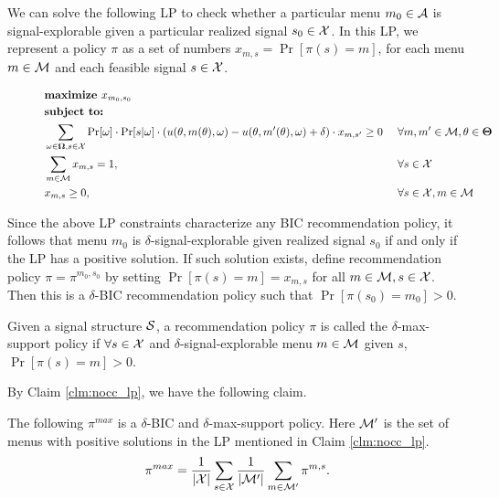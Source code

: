 We can solve the following LP to check whether a particular menu $m_0 \in\A$ is signal-explorable given a particular realized signal $s_0\in\X$. In this LP, we represent a policy $\pi$ as a set of numbers
    $x_{m,s} = \Pr[\pi(s)=m]$,
for each menu $m\in \M$ and each feasible signal $s\in \X$. 

\begin{figure}[H]
\begin{mdframed}
\begin{alignat*}{2}
 & \textbf{maximize }    x_{m_0,s_0}\  \\
&  \textbf{subject to: }\\
 & \sum_{\omega \in \varOmega, s \in \X} \Pr[\omega] \cdot \Pr[s | \omega] \cdot \left(u(\theta, m(\theta), \omega) - u(\theta, m'(\theta), \omega) + \delta\right) \cdot x_{m,s'} \geq 0  &\ & \forall m,m' \in \M, \theta \in \varTheta \\
                       & \sum_{m\in \M} x_{m,s} = 1,  \ &\ & \forall s \in \X \\
                       & x_{m,s} \geq 0,  \ &\ & \forall s \in \X, m\in \M \\
\end{alignat*}
\end{mdframed}
\label{fig:nocc_lp}
\end{figure}

Since the above LP constraints characterize any BIC recommendation policy, it follows that
menu $m_0$ is $\delta$-signal-explorable given realized signal $s_0$ if and only if the LP has a positive solution. If such solution exists, define recommendation policy $\pi = \pi^{m_0,s_0}$ by setting $\Pr[\pi(s) = m] = x_{m,s}$ for all $m \in \M, s \in \X$. Then this is a $\delta$-BIC recommendation policy such that $\Pr[\pi(s_0) = m_0] > 0$.

\begin{definition}
Given a signal structure $\S$, a recommendation policy $\pi$ is called the $\delta$-max-support policy if $\forall s \in \X$  and $\delta$-signal-explorable menu $m\in \M$ given $s$, $\Pr[\pi(s) = m] > 0$. 
\end{definition}

By Claim \ref{clm:nocc_lp}, we have the following claim.
\begin{claim}
\label{clm:pimax_nocc}
The following $\pi^{max}$ is a $\delta$-BIC and $\delta$-max-support policy. Here $\M'$ is the set of menus with positive solutions in the LP mentioned in Claim \ref{clm:nocc_lp}.
\[
\pi^{max} = \frac{1}{|\X|} \sum_{s \in \X} \frac{1}{|\M'|} \sum_{m \in \M'} \pi^{m,s}.
\]
\end{claim}

